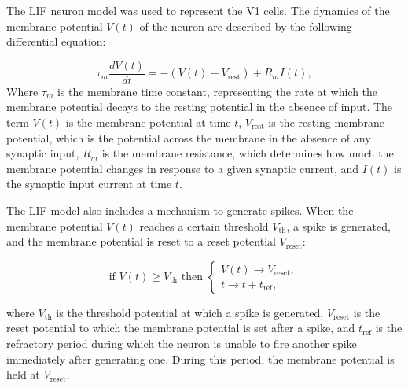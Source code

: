 \documentclass[12pt]{article}
\begin{document}
The LIF neuron model was used to represent the V1 cells. The dynamics of the membrane potential \(V(t)\) of the neuron are described by the following differential equation:

\begin{equation}
\tau_m \frac{dV(t)}{dt} = - (V(t) - V_{\text{rest}}) + R_m I(t),
\label{eq:LIF}
\end{equation}
Where \(\tau_m\) is the membrane time constant, representing the rate at which the membrane potential decays to the resting potential in the absence of input. The term \(V(t)\) is the membrane potential at time \(t\), \(V_{\text{rest}}\) is the resting membrane potential, which is the potential across the membrane in the absence of any synaptic input, \(R_m\) is the membrane resistance, which determines how much the membrane potential changes in response to a given synaptic current, and \(I(t)\) is the synaptic input current at time \(t\).

The LIF model also includes a mechanism to generate spikes. When the membrane potential \(V(t)\) reaches a certain threshold \(V_{\text{th}}\), a spike is generated, and the membrane potential is reset to a reset potential \(V_{\text{reset}}\):

\begin{equation}
\text{if } V(t) \geq V_{\text{th}} \text{ then } \begin{cases}
V(t) \rightarrow V_{\text{reset}}, \\
t \rightarrow t + t_{\text{ref}},
\end{cases}
\end{equation}

where \(V_{\text{th}}\) is the threshold potential at which a spike is generated, \(V_{\text{reset}}\) is the reset potential to which the membrane potential is set after a spike, and \(t_{\text{ref}}\) is the refractory period during which the neuron is unable to fire another spike immediately after generating one. During this period, the membrane potential is held at \(V_{\text{reset}}\).
\end{document}
